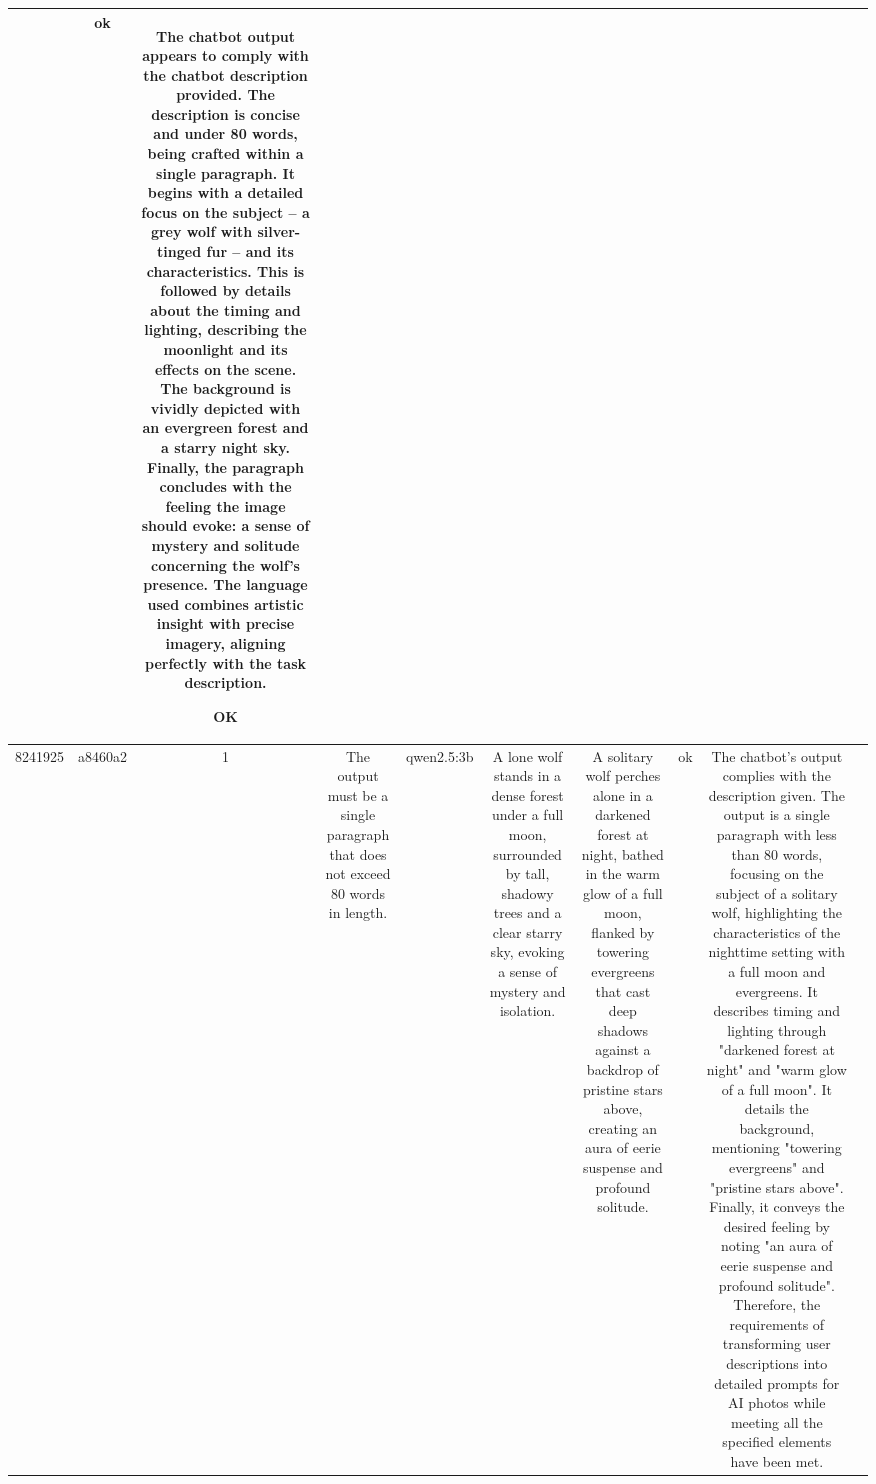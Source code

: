 \begin{table}[h!]
\begin{tabular}{|c|c|c|c|c|c|c|c|c|c|}
 & ok & The chatbot output appears to comply with the chatbot description provided. The description is concise and under 80 words, being crafted within a single paragraph. It begins with a detailed focus on the subject – a grey wolf with silver-tinged fur – and its characteristics. This is followed by details about the timing and lighting, describing the moonlight and its effects on the scene. The background is vividly depicted with an evergreen forest and a starry night sky. Finally, the paragraph concludes with the feeling the image should evoke: a sense of mystery and solitude concerning the wolf's presence. The language used combines artistic insight with precise imagery, aligning perfectly with the task description.

OK & \\
\hline
8241925 & a8460a2 & 1 & The output must be a single paragraph that does not exceed 80 words in length. & qwen2.5:3b & A lone wolf stands in a dense forest under a full moon, surrounded by tall, shadowy trees and a clear starry sky, evoking a sense of mystery and isolation. & A solitary wolf perches alone in a darkened forest at night, bathed in the warm glow of a full moon, flanked by towering evergreens that cast deep shadows against a backdrop of pristine stars above, creating an aura of eerie suspense and profound solitude. & ok & The chatbot's output complies with the description given. The output is a single paragraph with less than 80 words, focusing on the subject of a solitary wolf, highlighting the characteristics of the nighttime setting with a full moon and evergreens. It describes timing and lighting through "darkened forest at night" and "warm glow of a full moon". It details the background, mentioning "towering evergreens" and "pristine stars above". Finally, it conveys the desired feeling by noting "an aura of eerie suspense and profound solitude". Therefore, the requirements of transforming user descriptions into detailed prompts for AI photos while meeting all the specified elements have been met.


\end{tabular}
\end{table}
